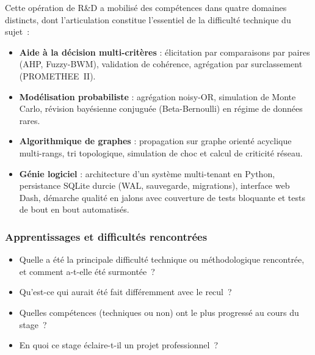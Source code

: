 Cette opération de R\&D a mobilisé des compétences dans quatre domaines distincts, dont l'articulation constitue l'essentiel de la difficulté technique du sujet~:
\begin{itemize}
    \item \textbf{Aide à la décision multi-critères} : élicitation par comparaisons par paires (AHP, Fuzzy-BWM), validation de cohérence, agrégation par surclassement (PROMETHEE~II).
    \item \textbf{Modélisation probabiliste} : agrégation noisy-OR, simulation de Monte Carlo, révision bayésienne conjuguée (Beta-Bernoulli) en régime de données rares.
    \item \textbf{Algorithmique de graphes} : propagation sur graphe orienté acyclique multi-rangs, tri topologique, simulation de choc et calcul de criticité réseau.
    \item \textbf{Génie logiciel} : architecture d'un système multi-tenant en Python, persistance SQLite durcie (WAL, sauvegarde, migrations), interface web Dash, démarche qualité en jalons avec couverture de tests bloquante et tests de bout en bout automatisés.
\end{itemize}

\subsubsection{Apprentissages et difficultés rencontrées}

\begin{itemize}
    \item Quelle a été la principale difficulté technique ou méthodologique rencontrée, et comment a-t-elle été surmontée~?
    \item Qu'est-ce qui aurait été fait différemment avec le recul~?
    \item Quelles compétences (techniques ou non) ont le plus progressé au cours du stage~?
    \item En quoi ce stage éclaire-t-il un projet professionnel~?
\end{itemize}
